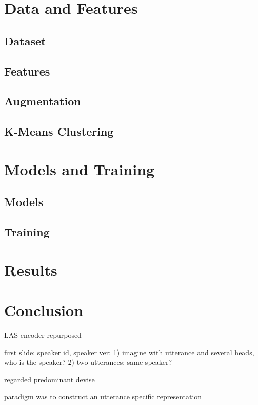 \documentclass[conference]{IEEEtran}
\begin{document}
\section{Data and Features}

\subsection{Dataset}

\subsection{Features}

\subsection{Augmentation}

\subsection{K-Means Clustering}

\section{Models and Training}

\subsection{Models}

\subsection{Training}

\section{Results}

\section{Conclusion}


LAS encoder repurposed

first slide: speaker id, speaker ver: 1) imagine with utterance and several heads, who is the speaker? 2) two utterances: same speaker?

regarded
predominant 
devise

paradigm was to construct an utterance specific representation  
\end{document}
